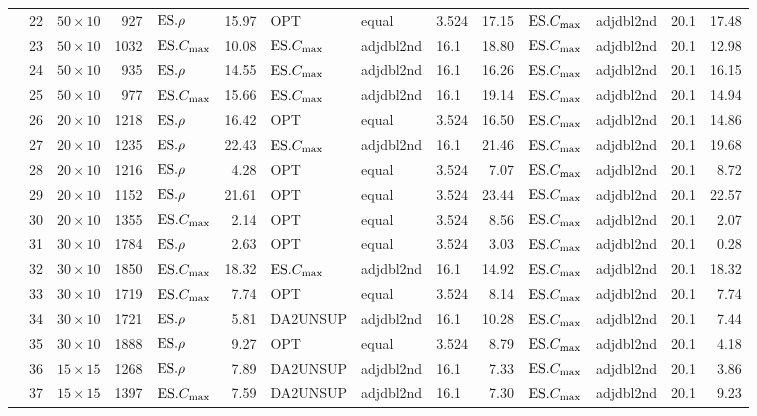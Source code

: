 {\begin{longtable}{l@{}rlr|l@{ }r|l@{ }l@{ }l@{ }r|l@{ }l@{ }l@{ }r}
  &22 & $50\times10$ & 927 & $\text{ES}.{\rho}$ & 15.97 & OPT & equal & 3.524 & 
  17.15 & $\text{ES}.{C_{\max}}$ & adjdbl2nd & 20.1 & 17.48 \\ 
  &23 & $50\times10$ & 1032 & $\text{ES}.{C_{\max}}$ & 10.08 & $\text{ES}.{C_{\max}}$ & adjdbl2nd 
  & 16.1 & 18.80 & $\text{ES}.{C_{\max}}$ & adjdbl2nd & 20.1 & 12.98 \\ 
  &24 & $50\times10$ & 935 & $\text{ES}.{\rho}$ & 14.55 & $\text{ES}.{C_{\max}}$ & adjdbl2nd & 
  16.1 & 16.26 & $\text{ES}.{C_{\max}}$ & adjdbl2nd & 20.1 & 16.15 \\ 
  &25 & $50\times10$ & 977 & $\text{ES}.{C_{\max}}$ & 15.66 & $\text{ES}.{C_{\max}}$ & adjdbl2nd 
  & 16.1 & 19.14 & $\text{ES}.{C_{\max}}$ & adjdbl2nd & 20.1 & 14.94 \\ 
  &26 & $20\times10$ & 1218 & $\text{ES}.{\rho}$ & 16.42 & OPT & equal & 3.524 & 
  16.50 & $\text{ES}.{C_{\max}}$ & adjdbl2nd & 20.1 & 14.86 \\ 
  &27 & $20\times10$ & 1235 & $\text{ES}.{\rho}$ & 22.43 & $\text{ES}.{C_{\max}}$ & adjdbl2nd 
  & 16.1 & 21.46 & $\text{ES}.{C_{\max}}$ & adjdbl2nd & 20.1 & 19.68 \\ 
  &28 & $20\times10$ & 1216 & $\text{ES}.{\rho}$ & 4.28 & OPT & equal & 3.524 & 
  7.07 & $\text{ES}.{C_{\max}}$ & adjdbl2nd & 20.1 & 8.72 \\ 
  &29 & $20\times10$ & 1152 & $\text{ES}.{\rho}$ & 21.61 & OPT & equal & 3.524 & 
  23.44 & $\text{ES}.{C_{\max}}$ & adjdbl2nd & 20.1 & 22.57 \\ 
  &30 & $20\times10$ & 1355 & $\text{ES}.{C_{\max}}$ & 2.14 & OPT & equal & 3.524 & 
  8.56 & $\text{ES}.{C_{\max}}$ & adjdbl2nd & 20.1 & 2.07 \\ 
  &31 & $30\times10$ & 1784 & $\text{ES}.{\rho}$ & 2.63 & OPT & equal & 3.524 & 
  3.03 & $\text{ES}.{C_{\max}}$ & adjdbl2nd & 20.1 & 0.28 \\ 
  &32 & $30\times10$ & 1850 & $\text{ES}.{C_{\max}}$ & 18.32 & $\text{ES}.{C_{\max}}$ & adjdbl2nd 
  & 16.1 & 14.92 & $\text{ES}.{C_{\max}}$ & adjdbl2nd & 20.1 & 18.32 \\ 
  &33 & $30\times10$ & 1719 & $\text{ES}.{C_{\max}}$ & 7.74 & OPT & equal & 3.524 & 
  8.14 & $\text{ES}.{C_{\max}}$ & adjdbl2nd & 20.1 & 7.74 \\ 
  &34 & $30\times10$ & 1721 & $\text{ES}.{\rho}$ & 5.81 & DA2UNSUP & adjdbl2nd & 
  16.1 & 10.28 & $\text{ES}.{C_{\max}}$ & adjdbl2nd & 20.1 & 7.44 \\ 
  &35 & $30\times10$ & 1888 & $\text{ES}.{\rho}$ & 9.27 & OPT & equal & 3.524 & 
  8.79 & $\text{ES}.{C_{\max}}$ & adjdbl2nd & 20.1 & 4.18 \\ 
  &36 & $15\times15$ & 1268 & $\text{ES}.{\rho}$ & 7.89 & DA2UNSUP & adjdbl2nd & 
  16.1 & 7.33 & $\text{ES}.{C_{\max}}$ & adjdbl2nd & 20.1 & 3.86 \\ 
  &37 & $15\times15$ & 1397 & $\text{ES}.{C_{\max}}$ & 7.59 & DA2UNSUP & adjdbl2nd & 
  16.1 & 7.30 & $\text{ES}.{C_{\max}}$ & adjdbl2nd & 20.1 & 9.23 \\ 

\end{longtable}}
